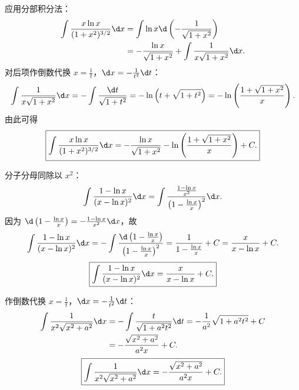 \begin{solution}

    应用分部积分法：
    \begin{equation}
        \begin{aligned}
            \int \frac{x \ln x}{(1 + x^2)^{3/2}} \d x & = \int \ln x \d\left( -\frac{1}{\sqrt{1 + x^2}} \right)                \\
                                                      & = -\frac{\ln x}{\sqrt{1 + x^2}} + \int \frac{1}{x\sqrt{1 + x^2}} \d x.
        \end{aligned}
    \end{equation}
    对后项作倒数代换 $x = \frac{1}{t}$，$\d x = -\frac{1}{t^2}\d t$：
    \begin{equation}
        \int \frac{1}{x\sqrt{1 + x^2}} \d x = -\int \frac{\d t}{\sqrt{1 + t^2}} = -\ln\left( t + \sqrt{1 + t^2} \right) = -\ln\left( \frac{1 + \sqrt{1 + x^2}}{x} \right).
    \end{equation}
    由此可得
    \begin{equation}
        \boxed{\int \frac{x \ln x}{(1 + x^2)^{3/2}} \d x = -\frac{\ln x}{\sqrt{1 + x^2}} - \ln\left( \frac{1 + \sqrt{1 + x^2}}{x} \right) + C.}
    \end{equation}


    分子分母同除以 $x^2$：
    \begin{equation}
        \int \frac{1 - \ln x}{(x - \ln x)^2} \d x = \int \frac{\frac{1 - \ln x}{x^2}}{\left( 1 - \frac{\ln x}{x} \right)^2} \d x.
    \end{equation}
    因为 $\d\left( 1 - \frac{\ln x}{x} \right) = -\frac{1 - \ln x}{x^2}\d x$，故
    \begin{equation}
        \int \frac{1 - \ln x}{(x - \ln x)^2} \d x = -\int \frac{\d\left( 1 - \frac{\ln x}{x} \right)}{\left( 1 - \frac{\ln x}{x} \right)^2} = \frac{1}{1 - \frac{\ln x}{x}} + C = \frac{x}{x - \ln x} + C.
    \end{equation}
    \begin{equation}
        \boxed{\int \frac{1 - \ln x}{(x - \ln x)^2} \d x = \frac{x}{x - \ln x} + C.}
    \end{equation}


    作倒数代换 $x = \frac{1}{t}$，$\d x = -\frac{1}{t^2}\d t$：
    \begin{equation}
        \begin{aligned}
            \int \frac{1}{x^2 \sqrt{x^2 + a^2}} \d x & = -\int \frac{t}{\sqrt{1 + a^2 t^2}} \d t = -\frac{1}{a^2}\sqrt{1 + a^2 t^2} + C \\
                                                     & = -\frac{\sqrt{x^2 + a^2}}{a^2 x} + C.
        \end{aligned}
    \end{equation}
    \begin{equation}
        \boxed{\int \frac{1}{x^2 \sqrt{x^2 + a^2}} \d x = -\frac{\sqrt{x^2 + a^2}}{a^2 x} + C.}
    \end{equation}


\end{solution}
